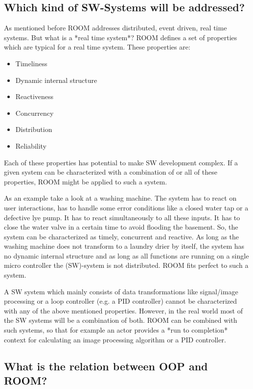 \subsection{Which kind of SW-Systems will be addressed?}

As mentioned before ROOM addresses distributed, event driven, real time systems. But what is a *real time system*? ROOM defines a set of properties which are typical for a real time system. These properties are:
\begin{itemize}
\item Timeliness
\item Dynamic internal structure
\item Reactiveness
\item Concurrency
\item Distribution
\item Reliability
\end{itemize}

Each of these properties has potential to make SW development complex. If a given system can be characterized with a combination of or all of these properties, ROOM might be applied to such a system.  

As an example take a look at a washing machine. The system has to react on user interactions, has to handle some error conditions like a closed water tap or a defective lye pump. It has to react simultaneously to all these inputs. It has to close the water valve in a certain time to avoid flooding the basement. 
So, the system can be characterized as timely, concurrent and reactive. As long as the washing machine does not transform to a laundry drier by itself, the system has no dynamic internal structure and as long as all functions are running on a single micro controller the (SW)-system is not distributed. 
ROOM fits perfect to such a system.

A SW system which mainly consists of data transformations like signal/image processing or a loop controller (e.g. a PID controller) cannot be characterized with any of the above mentioned properties. However, in the real world most of the SW systems will be a combination of both. ROOM can be combined with such systems, so that for example an actor provides a *run to completion* context for calculating an image processing algorithm or a PID controller.  

\subsection{What is the relation between OOP and ROOM?}

